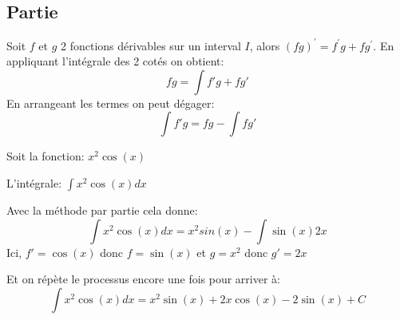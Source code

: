 \documentclass[12pt,a4paper]{report}
\begin{document}
 	\subsection*{Partie}
 	Soit $f$ et $g$ 2 fonctions dérivables sur un interval $I$, alors $(fg)^{'}=f^{'}g+fg^{'}$.
 	En appliquant l'intégrale des 2 cotés on obtient: \[fg= \int f'g + fg' \]
 	En arrangeant les termes on peut dégager: \[ \int f'g= fg-\int fg' \]
 	
 	
 	Soit la fonction: $ x^2\cos(x)$
 	
 	L'intégrale: $ \int x^2\cos(x)dx$
 	\smallskip
 	
 	Avec la méthode par partie cela donne: \[ \int x^2\cos(x)dx=x^2sin(x) - \int \sin(x)2x \]
 	Ici, $f'=\cos(x)$ donc $f=\sin(x)$ et $g=x^2$ donc $g'=2x$
 	
 	Et on répète le processus encore une fois pour arriver à: \[ \int x^2\cos(x)dx=x^2\sin(x)+2x\cos(x)-2\sin(x) + C \]
	
\end{document}
